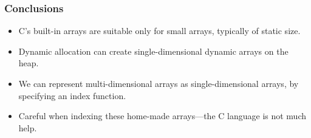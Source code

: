 \documentclass[rgb,dvipsnames,aspectratio=169,xcolor=table]{beamer}
\begin{document}
\begin{frame}
  \frametitle{Conclusions}

  \begin{itemize}
  \item C's built-in arrays are suitable only for small arrays,
    typically of static size.
  \item Dynamic allocation can create single-dimensional dynamic
    arrays on the heap.
  \item We can represent multi-dimensional arrays as
    single-dimensional arrays, by specifying an index function.
  \item Careful when indexing these home-made arrays---the C
    language is not much help.
  \end{itemize}

\end{frame}
\end{document}
